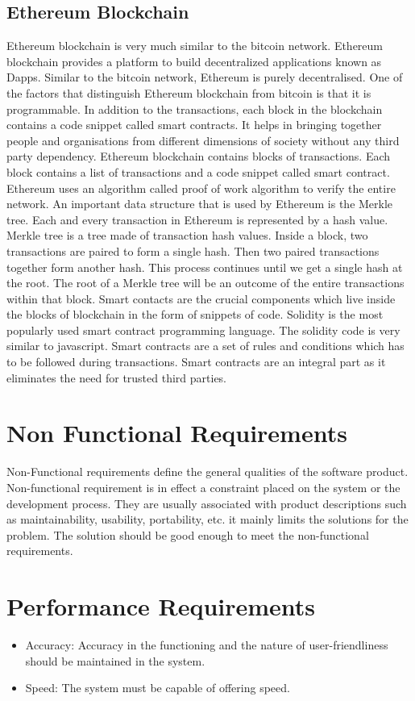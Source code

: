 \subsection{Ethereum Blockchain}
Ethereum blockchain is very much similar to the bitcoin network.
Ethereum blockchain provides a platform to build decentralized applications
known as Dapps. Similar to the bitcoin network, Ethereum is purely
decentralised. One of the factors that distinguish Ethereum blockchain from
bitcoin is that it is programmable. In addition to the transactions, each block in
the blockchain contains a code snippet called smart contracts. It helps in bringing
together people and organisations from different dimensions of society without
any third party dependency. Ethereum blockchain contains blocks of transactions.
Each block contains a list of transactions and a code snippet called smart contract.
Ethereum uses an algorithm called proof of work algorithm to verify the entire
network. An important data structure that is used by Ethereum is the Merkle tree.
Each and every transaction in Ethereum is represented by a hash value. Merkle
tree is a tree made of transaction hash values. Inside a block, two transactions
are paired to form a single hash. Then two paired transactions together form
another hash. This process continues until we get a single hash at the root. The
root of a Merkle tree will be an outcome of the entire transactions within that
block. Smart contacts are the crucial components which live inside the blocks of
blockchain in the form of snippets of code. Solidity is the most popularly used
smart contract programming language. The solidity code is very similar to
javascript. Smart contracts are a set of rules and conditions which has to be
followed during transactions. Smart contracts are an integral part as it eliminates
the need for trusted third parties.

\section{Non Functional Requirements}
Non-Functional requirements define the general qualities of the software product. Non-functional requirement is in effect a constraint placed on the system or the development process. They are usually associated with product descriptions such as maintainability, usability, portability, etc. it mainly limits the solutions for the problem. The solution should be good enough to meet the non-functional requirements. 
\section{Performance Requirements}
\begin{itemize}
    \item Accuracy: Accuracy in the functioning and the nature of user-friendliness should be maintained in the system. 
    \item Speed: The system must be capable of offering speed. 
\end{itemize}
